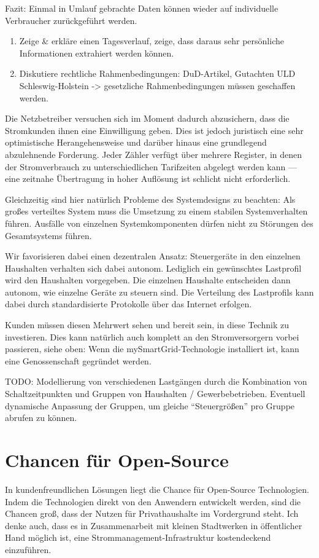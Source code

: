 \documentclass[12pt,BCOR=8.5mm]{scrartcl}
\begin{document}
Fazit: Einmal in Umlauf gebrachte Daten können wieder auf individuelle
Verbraucher zurückgeführt werden.


\begin{enumerate}
  \item Zeige \& erkläre einen Tagesverlauf, zeige, dass daraus sehr
	persönliche Informationen extrahiert werden können.
  \item Diskutiere rechtliche Rahmenbedingungen: DuD-Artikel, Gutachten
	ULD Schleswig-Holstein -> gesetzliche Rahmenbedingungen müssen
	geschaffen werden.
\end{enumerate}



Die Netzbetreiber versuchen sich im Moment dadurch abzusichern, dass die
Stromkunden ihnen eine Einwilligung geben. Dies ist jedoch juristisch
eine sehr optimistische Herangehensweise  und darüber hinaus eine grundlegend abzulehnende Forderung.
Jeder Zähler verfügt über mehrere Register, in denen der Stromverbrauch
zu unterschiedlichen Tarifzeiten abgelegt werden kann --- eine zeitnahe
Übertragung in hoher Auflösung ist schlicht nicht erforderlich.

Gleichzeitig sind hier natürlich Probleme des Systemdesigns zu beachten:
Als großes verteiltes System muss die Umsetzung zu einem stabilen
Systemverhalten führen. Ausfälle von einzelnen Systemkomponenten dürfen
nicht zu Störungen des Gesamtsystems führen.

Wir favorisieren dabei einen dezentralen Ansatz: Steuergeräte in den
einzelnen Haushalten verhalten sich dabei autonom. Lediglich ein
gewünschtes Lastprofil wird den Haushalten vorgegeben. Die einzelnen
Haushalte entscheiden dann autonom, wie einzelne Geräte zu steuern sind.
Die Verteilung des Lastprofils kann dabei durch standardisierte
Protokolle über das Internet erfolgen.


Kunden müssen diesen Mehrwert sehen und bereit sein, in diese Technik zu
investieren. Dies kann natürlich auch komplett an den Stromversorgern
vorbei passieren, siehe oben: Wenn die mySmartGrid-Technologie
installiert ist, kann eine Genossenschaft gegründet werden.

TODO: Modellierung von verschiedenen Lastgängen durch die Kombination
von Schaltzeitpunkten und Gruppen von Haushalten / Gewerbebetrieben.
Eventuell dynamische Anpassung der Gruppen, um gleiche ``Steuergrößen''
pro Gruppe abrufen zu können. 



\section{Chancen für Open-Source}\label{sec:chancen_open-source}
In kundenfreundlichen Lösungen liegt die Chance für Open-Source
Technologien. Indem die Technologien direkt von den Anwendern entwickelt
werden, sind die Chancen groß, dass der Nutzen für Privathaushalte im
Vordergrund steht.  Ich denke auch, dass es in Zusammenarbeit mit
kleinen Stadtwerken in öffentlicher Hand möglich ist, eine
Strommanagement-Infrastruktur kostendeckend einzuführen.
\end{document}
